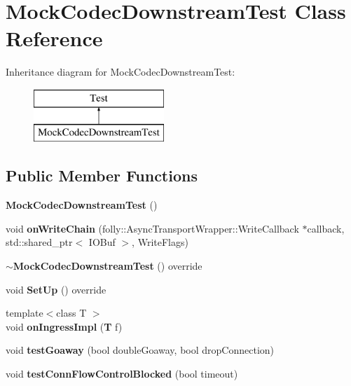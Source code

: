 \section{Mock\+Codec\+Downstream\+Test Class Reference}
\label{classMockCodecDownstreamTest}
Inheritance diagram for Mock\+Codec\+Downstream\+Test\+:\begin{figure}[H]
\begin{center}
\leavevmode
\includegraphics[height=2.000000cm]{classMockCodecDownstreamTest}
\end{center}
\end{figure}
\subsection*{Public Member Functions}
\begin{DoxyCompactItemize}
\item 
{\bf Mock\+Codec\+Downstream\+Test} ()
\item 
void {\bf on\+Write\+Chain} (folly\+::\+Async\+Transport\+Wrapper\+::\+Write\+Callback $\ast$callback, std\+::shared\+\_\+ptr$<$ I\+O\+Buf $>$, Write\+Flags)
\item 
{\bf $\sim$\+Mock\+Codec\+Downstream\+Test} () override
\item 
void {\bf Set\+Up} () override
\item 
{\footnotesize template$<$class T $>$ }\\void {\bf on\+Ingress\+Impl} ({\bf T} f)
\item 
void {\bf test\+Goaway} (bool double\+Goaway, bool drop\+Connection)
\item 
void {\bf test\+Conn\+Flow\+Control\+Blocked} (bool timeout)
\end{DoxyCompactItemize}
